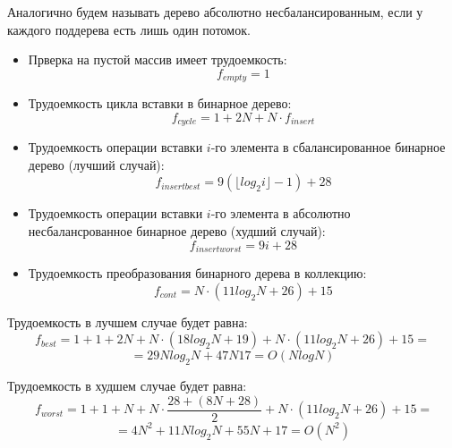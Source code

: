 Аналогично будем называть дерево абсолютно несбалансированным, если у каждого
поддерева есть лишь один потомок.

\begin{itemize}
    \item Прверка на пустой массив имеет трудоемкость:
    \begin{equation}
        \label{for::binary_tree_empty}
        f_{empty} = 1
    \end{equation}
    \item Трудоемкость цикла вставки в бинарное дерево:
    \begin{equation}
        \label{for::binary_tree_insert_cycle}
        f_{cycle} = 1 + 2N + N \cdot f_{insert}
    \end{equation}
    \item Трудоемкость операции вставки $i$-го элемента в сбалансированное бинарное дерево (лучший случай):
    \begin{equation}
        \label{for::binary_tree_insert_best_case}
        f_{insert best} = 9(\lfloor{log_2 i}\rfloor - 1) + 28
    \end{equation}
    \item Трудоемкость операции вставки $i$-го элемента в абсолютно несбалансрованное бинарное дерево (худший случай):
    \begin{equation}
        \label{for::binary_tree_insert_worst_case}
        f_{insert worst} = 9i + 28
    \end{equation}
    \item Трудоемкость преобразования бинарного дерева в коллекцию:
    \begin{equation}
        \label{for::binary_tree_to_container}
        f_{cont} = N \cdot (11 log_2 N  + 26)  + 15
    \end{equation}
\end{itemize}

Трудоемкость в лучшем случае будет равна:
\begin{equation}
    \label{for:binary_tree_best_1}
    f_{best} = 1 + 1 + 2N + N \cdot (18 log_2 N + 19) + N \cdot (11 log_2 N  + 26)  + 15 =
\end{equation}
\begin{equation}
    \label{for:binary_tree_best_2}
    = 29 N log_2 N + 47N 17 = O(N log N)
\end{equation}

Трудоемкость в худшем случае будет равна:
\begin{equation}
    \label{for:binary_tree_worst_1}\
    f_{worst} = 1 + 1 + N + N \cdot \frac{28 + (8N + 28)}{2} + N \cdot (11 log_2 N  + 26)  + 15 =
\end{equation}
\begin{equation}
    \label{for:binary_tree_worst_2}
    = 4N^2 + 11 N log_2 N + 55N + 17 = O(N^2)
\end{equation}


